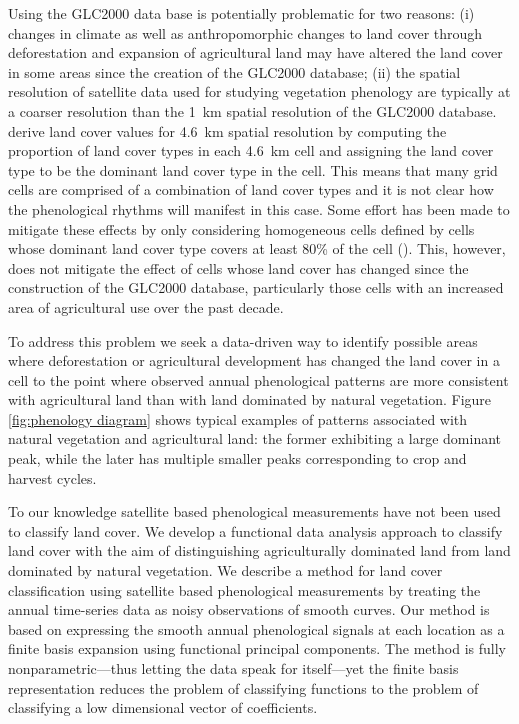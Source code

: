 Using the GLC2000 data base is potentially problematic for two reasons: (i) changes in climate as well as anthropomorphic changes to land cover through deforestation and expansion of agricultural land may have altered the land cover in some areas since the creation of the GLC2000 database; (ii) the spatial resolution of satellite data used for studying vegetation phenology are typically at a coarser resolution than the 1~km spatial resolution of the GLC2000 database. \cite{Dash:2010kva} derive land cover values for 4.6~km spatial resolution by computing the proportion of land cover types in each 4.6~km cell and assigning the land cover type to be the dominant land cover type in the cell. This means that many grid cells are comprised of a combination of land cover types and it is not clear how the phenological rhythms will manifest in this case. Some effort has been made to mitigate these effects by only considering homogeneous cells defined by cells whose dominant land cover type covers at least 80\% of the cell (\cite{Jeganathan:2010gqa}). This, however, does not mitigate the effect of cells whose land cover has changed since the construction of the GLC2000 database, particularly those cells with an increased area of agricultural use over the past decade. 

To address this problem we seek a data-driven way to identify possible areas where deforestation or agricultural development has changed the land cover in a cell to the point where observed annual phenological patterns are more consistent with agricultural land than with land dominated by natural vegetation. Figure \ref{fig:phenology diagram} shows typical examples of patterns associated with natural vegetation and agricultural land: the former exhibiting a large dominant peak, while the later has multiple smaller peaks corresponding to crop and harvest cycles. 

To our knowledge satellite based phenological measurements have not been used to classify land cover. We develop a functional data analysis approach to classify land cover with the aim of distinguishing agriculturally dominated land from land dominated by natural vegetation. We describe a method for land cover classification using satellite based phenological measurements by treating the annual time-series data as noisy observations of smooth curves. Our method is based on expressing the smooth annual phenological signals at each location as a finite basis expansion using functional principal components. The method is fully nonparametric---thus letting the data speak for itself---yet the finite basis representation reduces the problem of classifying functions to the problem of classifying a low dimensional vector of coefficients. 


